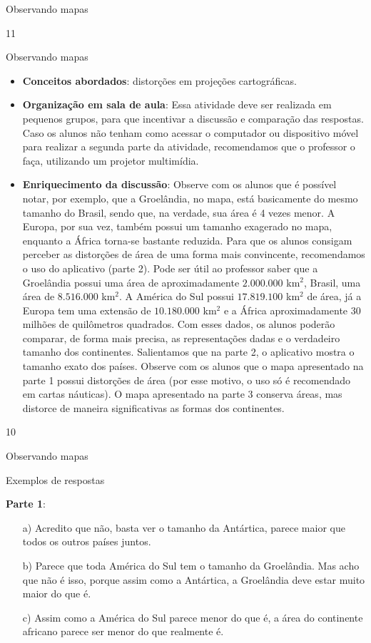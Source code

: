 {\begin{objectives}{Observando mapas}
{\begin{itemize}
  \end{itemize}
}{1}{1}
\end{objectives}
\clearmargin
\begin{sugestions}{Observando mapas}
{
  \begin{itemize}
  \item  \textbf{Conceitos abordados}: distorções em projeções cartográficas.
  \item \textbf{Organização em sala de aula}: Essa atividade deve ser realizada em pequenos grupos, para que incentivar a discussão e comparação das respostas. Caso os alunos não tenham como acessar o computador ou dispositivo móvel para realizar a segunda parte da atividade, recomendamos que o professor o faça, utilizando um projetor multimídia.
  \item \textbf{Enriquecimento da discussão}:    Observe com os alunos que é possível notar, por exemplo, que a Groelândia, no mapa, está basicamente do mesmo tamanho do Brasil, sendo que, na verdade, sua área é 4 vezes menor. A Europa, por sua vez, também possui um tamanho exagerado no mapa, enquanto a África torna-se bastante reduzida. Para que os alunos consigam perceber as distorções de área de uma forma mais convincente, recomendamos o uso do aplicativo (parte 2). Pode ser útil ao professor saber que a Groelândia possui uma área de aproximadamente $2.000.000$ km$^{2}$, Brasil, uma área de $8.516.000$ km$^2$. A América do Sul possui $17.819.100$ km$^2$ de área, já a Europa tem uma extensão de $10.180.000$ km$^2$ e a África aproximadamente 30 milhões de quilômetros quadrados.  Com esses dados, os alunos poderão comparar, de forma mais precisa, as representações dadas e o verdadeiro tamanho dos continentes. Salientamos que na parte 2, o aplicativo mostra o tamanho exato dos países. Observe com os alunos que o mapa apresentado na parte 1 possui distorções de área (por esse motivo, o uso só é recomendado em cartas náuticas). O mapa apresentado na parte 3 conserva áreas, mas distorce de maneira significativas as formas dos continentes.

  \end{itemize}
}{1}{0}
\end{sugestions}
\begin{answer}{Observando mapas}
{ Exemplos de respostas
  \vspace{.3em}

  \textbf{Parte 1}:
 
\begin{itemize}
\item[a)] Acredito que não, basta ver o tamanho da Antártica, parece maior que todos os outros países juntos. 
\item [b)] Parece que toda América do Sul tem o tamanho da Groelândia. Mas acho que não é isso, porque assim como a Antártica, a Groelândia deve estar muito maior do que é.
\item [c)] Assim como a América do Sul parece menor do que é, a área do continente africano parece ser menor do que realmente é.
\end{itemize} 
 
}
\end{answer}}
